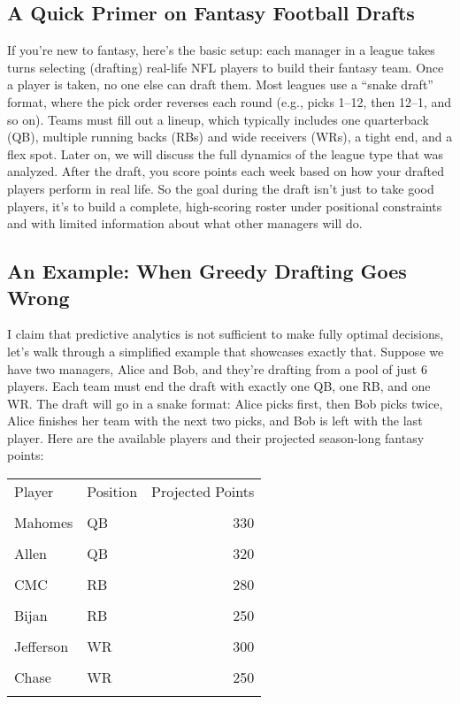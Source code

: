 \documentclass{article}
\begin{document}
\subsection*{A Quick Primer on Fantasy Football Drafts}
If you're new to fantasy, here's the basic setup: each manager in a league takes turns selecting (drafting) real-life NFL players to build their fantasy team.
Once a player is taken, no one else can draft them. Most leagues use a “snake draft” format, where the pick order reverses each round (e.g., picks 1–12, then 12–1, and so on).
Teams must fill out a lineup, which typically includes one quarterback (QB), multiple running backs (RBs) and wide receivers (WRs), a tight end, and a flex spot.
Later on, we will discuss the full dynamics of the league type that was analyzed.
After the draft, you score points each week based on how your drafted players perform in real life.
So the goal during the draft isn't just to take good players, it's to build a complete, high-scoring roster under positional constraints and with limited information about what other managers will do.

\subsection*{An Example: When Greedy Drafting Goes Wrong}
I claim that predictive analytics is not sufficient to make fully optimal decisions, let's walk through a simplified example that showcases exactly that.
Suppose we have two managers, Alice and Bob, and they're drafting from a pool of just 6 players.
Each team must end the draft with exactly one QB, one RB, and one WR.
The draft will go in a snake format: Alice picks first, then Bob picks twice, Alice finishes her team with the next two picks, and Bob is left with the last player.
Here are the available players and their projected season-long fantasy points:

\begin{center}
\begin{tabular}{l l r}
\toprule
Player & Position & Projected Points \\\\
\midrule
Mahomes & QB & 330 \\\\
Allen & QB & 320 \\\\
CMC & RB & 280 \\\\
Bijan & RB & 250 \\\\
Jefferson & WR & 300 \\\\
Chase & WR & 250 \\\\
\bottomrule
\end{tabular}
\end{center}
\end{document}
